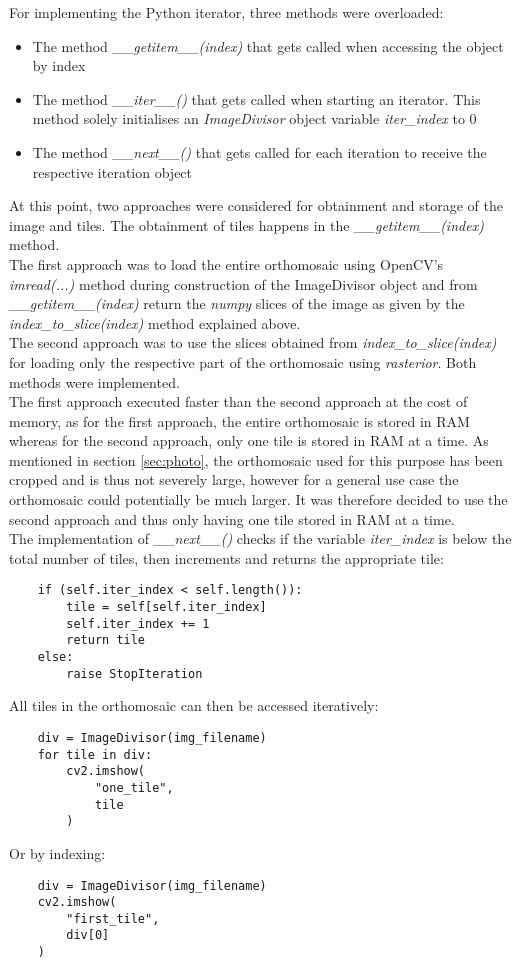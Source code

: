 \documentclass[../Head/Main.tex]{subfiles}
\begin{document}
For implementing the Python iterator, three methods were overloaded:
\begin{itemize}
\item The method \textit{\_\_getitem\_\_(index)} that gets called when accessing the object by index
\item The method \textit{\_\_iter\_\_()} that gets called when starting an iterator. This method solely initialises an \textit{ImageDivisor} object variable \textit{iter\_index} to 0
\item The method \textit{\_\_next\_\_()} that gets called for each iteration to receive the respective iteration object
\end{itemize}
At this point, two approaches were considered for obtainment and storage of the image and tiles. The obtainment of tiles happens in the \textit{\_\_getitem\_\_(index)} method.\\
The first approach was to load the entire orthomosaic using OpenCV's \textit{imread(...)} method during construction of the ImageDivisor object and from \textit{\_\_getitem\_\_(index)} return the \textit{numpy} slices of the image as given by the \textit{index\_to\_slice(index)} method explained above.\\
The second approach was to use the slices obtained from \textit{index\_to\_slice(index)} for loading only the respective part of the orthomosaic using \textit{rasterior}. Both methods were implemented.\\
The first approach executed faster than the second approach at the cost of memory, as for the first approach, the entire orthomosaic is stored in RAM whereas for the second approach, only one tile is stored in RAM at a time. As mentioned in section \ref{sec:photo}, the orthomosaic used for this purpose has been cropped and is thus not severely large, however for a general use case the orthomosaic could potentially be much larger. It was therefore decided to use the second approach and thus only having one tile stored in RAM at a time.\\
The implementation of \textit{\_\_next\_\_()} checks if the variable \textit{iter\_index} is below the total number of tiles, then increments and returns the appropriate tile:
\begin{verbatim}
    if (self.iter_index < self.length()):
        tile = self[self.iter_index]
        self.iter_index += 1
        return tile
    else:
        raise StopIteration
\end{verbatim}
All tiles in the orthomosaic can then be accessed iteratively:
\begin{verbatim}
    div = ImageDivisor(img_filename)
    for tile in div:
        cv2.imshow(
            "one_tile",
            tile
        )
\end{verbatim}
Or by indexing:
\begin{verbatim}
    div = ImageDivisor(img_filename)
    cv2.imshow(
        "first_tile",
        div[0]
    )
\end{verbatim}
\end{document}
